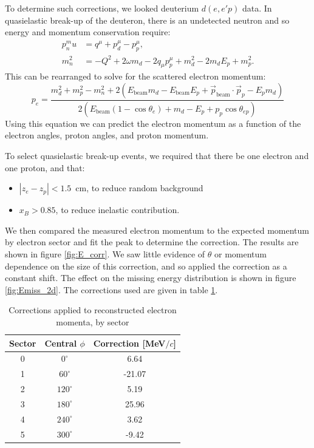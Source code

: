 \documentclass{article}
\begin{document}
To determine such corrections, we looked deuterium $d(e,e'p)$ data. In quasielastic
break-up of the deuteron, there is an undetected neutron and so energy and momentum 
conservation require:
\begin{align}
p_n^mu &= q^\mu + p_d^\mu - p_p^\mu,\\
m_n^2 &= -Q^2 + 2\omega m_d - 2 q_\mu p_p^\mu + m_d^2 - 2 m_d E_p + m_p^2.
\end{align}
This can be rearranged to solve for the scattered electron momentum:
\begin{equation}
p_e = \frac{m_d^2 + m_p^2 - m_n^2 + 2(E_\text{beam}m_d - E_\text{beam} E_p + \vec{p}_\text{beam}\cdot\vec{p}_p - E_pm_d)}
{2(E_\text{beam} ( 1 - \cos\theta_e) + m_d - E_p + p_p \cos\theta_{ep})}
\end{equation}
Using this equation we can predict the electron momentum as a function of 
the electron angles, proton angles, and proton momentum.

To select quasielastic break-up events, we required that there be one electron
and one proton, and that:
\begin{itemize}
\item $|z_e - z_p| < 1.5$~cm, to reduce random background
\item $x_B > 0.85$, to reduce inelastic contribution.
\end{itemize}
We then compared the measured electron momentum to the expected momentum by electron
sector and fit the peak to determine the correction. The results are shown in figure
\ref{fig:E_corr}. We saw little evidence of $\theta$ or momentum dependence on the
size of this correction, and so applied the correction as a constant shift. The
effect on the missing energy distribution is shown in figure \ref{fig:Emiss_2d}.
The corrections used are given in table \ref{tab:Ecorr}.

\begin{table}[htb]
\centering
\begin{tabular}{c c c}
\hline
\hline
Sector & Central $\phi$ & Correction [MeV$/c$]\\
\hline
0 & $0^\circ$ &  6.64 \\
1 & $60^\circ$ & -21.07 \\
2 & $120^\circ$ & 5.19\\
3 & $180^\circ$ & 25.96\\
4 & $240^\circ$ & 3.62\\
5 & $300^\circ$ & -9.42\\
\hline
\end{tabular}
\caption{Corrections applied to reconstructed electron momenta, by sector \label{tab:Ecorr}}
\end{table}
\end{document}
